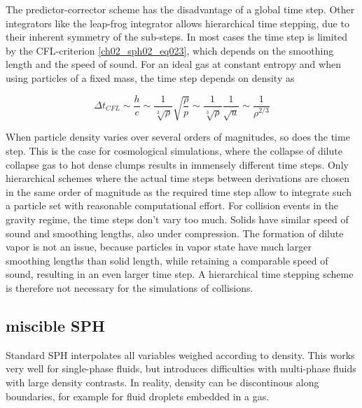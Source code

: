 The predictor-corrector scheme has the disadvantage of a global time step. Other integrators like the leap-frog integrator allows hierarchical time stepping, due to their inherent symmetry of the sub-steps. In most cases the time step is limited by the CFL-criterion \ref{ch02_sph02_eq023}, which depends on the smoothing length and the speed of sound. For an ideal gas at constant entropy and when using particles of a fixed mass, the time step depends on density as 

\begin{equation}
\label{ch02_sph02_eq025}
\Delta t_{CFL} \sim \frac{h}{c} \sim \frac{1}{\sqrt[3]{\rho}} \sqrt{ \frac{\rho}{p} } \sim \frac{1}{\sqrt[3]{\rho}} \frac{1}{\sqrt{u}} \sim \frac{1}{\rho^{2/3}}
\end{equation}

When particle density varies over several orders of magnitudes, so does the time step. This is the case for cosmological simulations, where the collapse of dilute collapse gas to hot dense clumps results in immensely different time steps. Only hierarchical schemes where the actual time steps between derivations are chosen in the same order of magnitude as the required time step allow to integrate such a particle set with reasonable computational effort.
For collision events in the gravity regime, the time steps don't vary too much. Solids have similar speed of sound and smoothing lengths, also under compression. The formation of dilute vapor is not an issue, because particles in vapor state have much larger smoothing lengths than solid length, while retaining a comparable speed of sound, resulting in an even larger time step. A hierarchical time stepping scheme is therefore not necessary for the simulations of collisions.

\subsection{miscible SPH}
Standard SPH interpolates all variables weighed according to density. This works very well for single-phase fluids, but introduces difficulties with multi-phase fluids with large density contrasts. In reality, density can be discontinous along boundaries, for example for fluid droplets embedded in a gas. 

